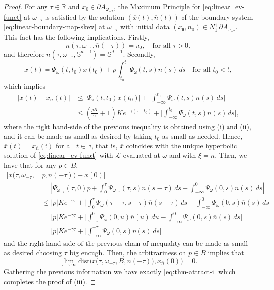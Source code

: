 \documentclass[reqno]{amsart}
\theoremstyle{definition}
\numberwithin{equation}{section}
\newcommand{\R}{\mathbb{R}}
\newcommand{\dist}{\mathrm{dist}}
\begin{document}
\begin{proof}
For any $\tau\in\R$ and $x_0\in\partial A_{\omega_{-\tau}}$, the Maximum Principle for \eqref{eq:linear_ev-funct} at $\omega_{-\tau}$ is satisfied by the solution $(\overline x (t),\overline n(t))$ of the boundary system \eqref{eq:linear-boundary-map-skew} at $\omega_{-\tau}$ with initial data $(x_0, n_0)\in N^+_1\partial A_{\omega_{-\tau}}$.
This fact has the following implications. Firstly,
\[
n(\tau,\omega_{-\tau}, \overline n(-\tau))=n_0,\quad\text{for all }\tau>0,
\]
and therefore $n(\tau,\omega_{-\tau}, \mathbb{S}^{d-1})=\mathbb{S}^{d-1}$. Secondly,
$$
\overline x(t)=\Psi_{\omega}(t,t_0)\overline x(t_0)+\rho\int_{t_0}^t \Psi_{\omega}(t,s)\overline n(s)\, ds\quad \text{for all }t_0<t,
$$
which implies 
\[
\begin{split}
|\overline x(t)-x_{\overline n}(t) |&\le |\Psi_{\omega}(t,t_0)\overline x(t_0)|+ \Big|\int_{-\infty}^{t_0}\Psi_{\omega}(t,s)\overline n(s)\, ds \Big|\\
&\le \left(\frac{\rho K} \gamma +1\right)Ke^{-\gamma (t-t_0)} +\Big|\int_{-\infty}^{t_0}\Psi_{\omega}(t,s)\overline n(s)\, ds \Big|,
\end{split}
\]
where the right hand-side of the previous inequality  is obtained using (i) and (ii), and it can be made as small as desired by taking $t_0$ as small as needed. Hence, $\overline x(t)=x_{\overline n}(t)$ for all $t\in\R$, that is, $\overline x$ coincides with the unique hyperbolic solution of \eqref{eq:linear_ev-funct} with $\mathscr L$ evaluated at $\omega$ and with $\xi=\overline n$. Then, we have that for any $p\in B$,
\[
\begin{split}
| x\big(\tau,\omega_{-\tau},\, &p,\overline n(-\tau)\big)- \overline x(0)|\\
&=| \Psi_{\omega_{-\tau}}(\tau,0)p +\int_{0}^{\tau}\Psi_{\omega_{-\tau}}(\tau,s)\overline n(s-\tau)\, ds -\int_{-\infty}^{0}\Psi_{\omega}(0,s)\overline n(s)\, ds|\\
&\le |p|Ke^{-\gamma \tau}+\Big| \int_{0}^{\tau}\Psi_{\omega}(\tau-\tau,s-\tau)\overline n(s-\tau)\, ds -\int_{-\infty}^{0}\Psi_{\omega}(0,s)\overline n(s)\, ds\Big|\\
&=|p|Ke^{-\gamma \tau}+\Big| \int_{-\tau}^{0}\Psi_{\omega}(0,u)\overline n(u)\, du -\int_{-\infty}^{0}\Psi_{\omega}(0,s)\overline n(s)\, ds\Big|\\
&=|p|Ke^{-\gamma \tau}+\Big| \int_{-\infty}^{-\tau}\Psi_{\omega}(0,s)\overline n(s)\, ds\Big|
\end{split}
\]
and the right hand-side of the previous chain of inequality can be made as small as desired choosing $\tau$ big enough. Then, the arbitrariness on $p\in B$ implies that 
\[
\lim_{\tau\to\infty}\dist\Big(x\big(\tau,\omega_{-\tau},B,\overline n(-\tau)\big), x_{\overline  n}(0)\Big)=0.
\]
Gathering the previous information we have exactly \eqref{eq:thm-attract-i} which completes the proof of (iii).\par\smallskip


\end{proof}
\end{document}
